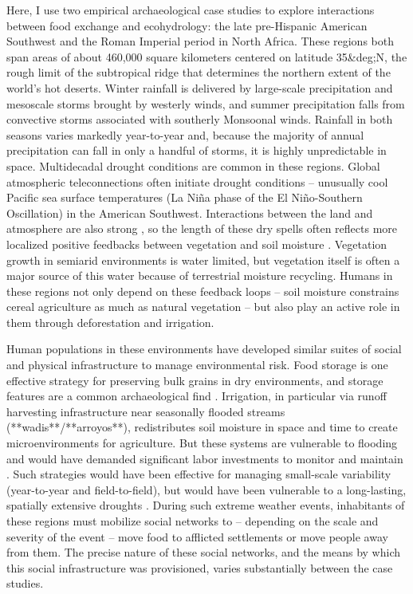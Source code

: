 \documentclass[fleqn,10pt]{wlscirep}
\begin{document}
Here, I use two empirical archaeological case studies to explore interactions between food exchange and ecohydrology: the late pre-Hispanic American Southwest and the Roman Imperial period in North Africa. These regions both span areas of about 460,000 square kilometers centered on latitude 35&deg;N, the rough limit of the subtropical ridge that determines the northern extent of the world's hot deserts. Winter rainfall is delivered by large-scale precipitation and mesoscale storms brought by westerly winds, and summer precipitation falls from convective storms associated with southerly Monsoonal winds. Rainfall in both seasons varies markedly year-to-year and, because the majority of annual precipitation can fall in only a handful of storms, it is highly unpredictable in space. Multidecadal drought conditions are common in these regions. Global atmospheric teleconnections often initiate drought conditions -- unusually cool Pacific sea surface temperatures (La Ni\~{n}a phase of the El Ni\~{n}o-Southern Oscillation) in the American Southwest. Interactions between the land and atmosphere are also strong \cite{Koster2004RegionsPrecipitation}, so the length of these dry spells often reflects more localized positive feedbacks between vegetation and soil moisture \cite{Ault2014AssessingData}. Vegetation growth in semiarid environments is water limited, but vegetation itself is often a major source of this  water because of terrestrial moisture recycling. Humans in these regions not only depend on these feedback loops -- soil moisture constrains cereal agriculture as much as natural vegetation -- but also play an active role in them through deforestation and irrigation.

Human populations in these environments have developed similar suites of social and physical infrastructure to manage environmental risk. Food storage is one effective strategy for preserving bulk grains in dry environments, and storage features are a common archaeological find \cite{Spielmann2011SustainableEnvironments}. Irrigation, in particular via runoff harvesting infrastructure near seasonally flooded streams (**wadis**/**arroyos**), redistributes soil moisture in space and time to create microenvironments for agriculture. But these systems are vulnerable to flooding and would have demanded significant labor investments to monitor and maintain \cite{Shaw1982, Dominguez2005,Beckers2013AncientAsia}. Such strategies would have been effective for managing small-scale variability (year-to-year and field-to-field), but would have been vulnerable to a long-lasting, spatially extensive droughts \cite{Halstead1989}. During such extreme weather events, inhabitants of these regions must mobilize social networks to -- depending on the scale and severity of the event -- move food to afflicted settlements or move people away from them. The precise nature of these social networks, and the means by which this social infrastructure was provisioned, varies substantially between the case studies.
\end{document}
